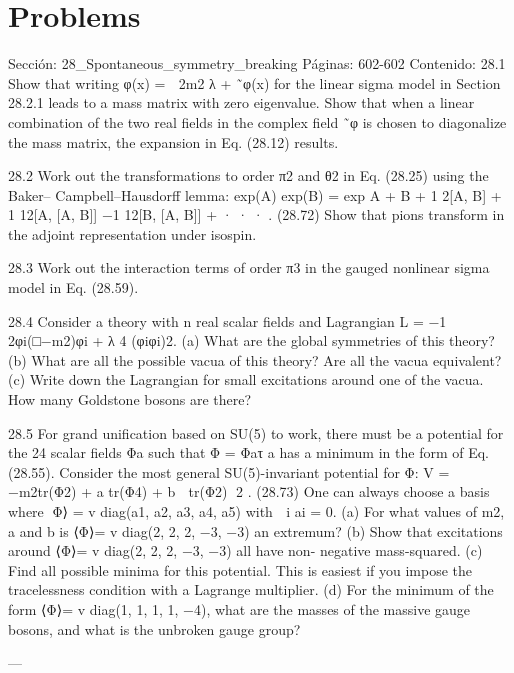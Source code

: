 \section*{Problems}
Sección: 28_Spontaneous_symmetry_breaking
Páginas: 602-602
Contenido:
28.1 Show that writing φ(x) =

2m2
λ + ˜φ(x) for the linear sigma model in Section 28.2.1
leads to a mass matrix with zero eigenvalue. Show that when a linear combination of
the two real ﬁelds in the complex ﬁeld ˜φ is chosen to diagonalize the mass matrix,
the expansion in Eq. (28.12) results.

28.2 Work out the transformations to order π2 and θ2 in Eq. (28.25) using the Baker–
Campbell–Hausdorff lemma:
exp(A) exp(B)
= exp
A + B + 1
2[A, B] + 1
12[A, [A, B]] −1
12[B, [A, B]] + · · ·
. (28.72)
Show that pions transform in the adjoint representation under isospin.

28.3 Work out the interaction terms of order π3 in the gauged nonlinear sigma model in
Eq. (28.59).

28.4 Consider a theory with n real scalar ﬁelds and Lagrangian L = −1
2φi(□−m2)φi +
λ
4 (φiφi)2.
(a) What are the global symmetries of this theory?
(b) What are all the possible vacua of this theory? Are all the vacua equivalent?
(c) Write down the Lagrangian for small excitations around one of the vacua. How
many Goldstone bosons are there?

28.5 For grand uniﬁcation based on SU(5) to work, there must be a potential for the 24
scalar ﬁelds Φa such that Φ = Φaτ a has a minimum in the form of Eq. (28.55).
Consider the most general SU(5)-invariant potential for Φ:
V = −m2tr(Φ2) + a tr(Φ4) + b

tr(Φ2)
2 .
(28.73)
One can always choose a basis where ⟨Φ⟩
=
v diag(a1, a2, a3, a4, a5) with

i ai = 0.
(a) For what values of m2, a and b is ⟨Φ⟩= v diag(2, 2, 2, −3, −3) an extremum?
(b) Show that excitations around ⟨Φ⟩= v diag(2, 2, 2, −3, −3) all have non-
negative mass-squared.
(c) Find all possible minima for this potential. This is easiest if you impose the
tracelessness condition with a Lagrange multiplier.
(d) For the minimum of the form ⟨Φ⟩= v diag(1, 1, 1, 1, −4), what are the masses
of the massive gauge bosons, and what is the unbroken gauge group?


---

